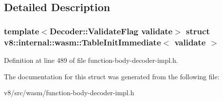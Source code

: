 \subsection{Detailed Description}
\subsubsection*{template$<$Decoder\+::\+Validate\+Flag validate$>$\newline
struct v8\+::internal\+::wasm\+::\+Table\+Init\+Immediate$<$ validate $>$}



Definition at line 489 of file function-\/body-\/decoder-\/impl.\+h.



The documentation for this struct was generated from the following file\+:\begin{DoxyCompactItemize}
\item 
v8/src/wasm/function-\/body-\/decoder-\/impl.\+h\end{DoxyCompactItemize}
